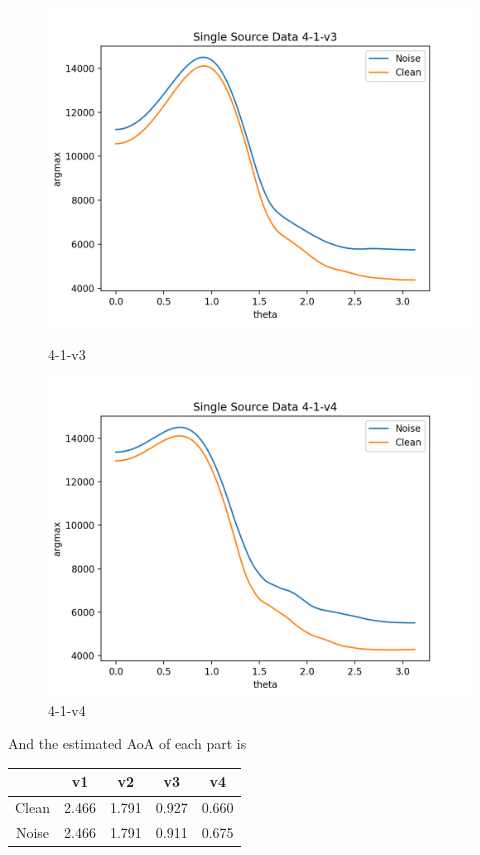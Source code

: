 \documentclass{article}
\begin{document}
\begin{figure}[H]
            \begin{minipage}{0.49\linewidth}
                \centering
                \includegraphics[width=0.9\linewidth]{pic/Figure_3.png}
                \caption{4-1-v3}
            \end{minipage}
            \begin{minipage}{0.49\linewidth}
                \centering
                \includegraphics[width=0.9\linewidth]{pic/Figure_4.png}
                \caption{4-1-v4}
            \end{minipage}
        \end{figure}

        And the estimated AoA of each part is 

        \begin{table}[H]
            \centering
            \begin{tabular}{@{}ccccc@{}}
            \toprule
                  & v1    & v2    & v3    & v4    \\ \midrule
            Clean & 2.466 & 1.791 & 0.927 & 0.660 \\
            Noise & 2.466 & 1.791 & 0.911 & 0.675 \\ \bottomrule
            \end{tabular}
        \end{table}
    
\end{document}
